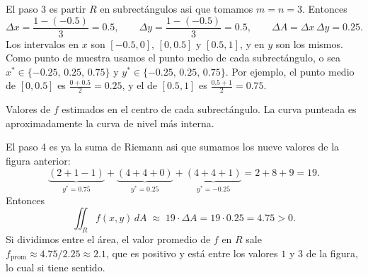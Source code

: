 \begin{respuesta}
    El paso 3 es partir $R$ en subrectángulos asi que tomamos $m=n=3$. Entonces
    \[
        \Delta x = \frac{1-(-0.5)}{3} = 0.5, \qquad
        \Delta y = \frac{1-(-0.5)}{3} = 0.5, \qquad
        \Delta A = \Delta x \,\Delta y = 0.25 .
    \]
    Los intervalos en $x$ son $[-0.5,0]$, $[0,0.5]$ y $[0.5,1]$, y en $y$ son los mismos.
    Como punto de muestra usamos el punto medio de cada subrectángulo, o sea
    $x^*\in\{-0.25,\,0.25,\,0.75\}$ y $y^*\in\{-0.25,\,0.25,\,0.75\}$.
    Por ejemplo, el punto medio de $[0,0.5]$ es $\frac{0+0.5}{2}=0.25$, y el de
    $[0.5,1]$ es $\frac{0.5+1}{2}=0.75$.

    \begin{center}

    \small Valores de $f$ estimados en el centro de cada subrectángulo.
    La curva punteada es aproximadamente la curva de nivel más interna.
    \end{center}

    El paso 4 es ya la suma de Riemann asi que sumamos los nueve valores de la figura anterior:
    \[
        \underbrace{(2+1-1)}_{y^*=0.75} + \underbrace{(4+4+0)}_{y^*=0.25}
        + \underbrace{(4+4+1)}_{y^*=-0.25} = 2 + 8 + 9 = 19 .
    \]
    Entonces
    \[
        \iint_R f(x,y)\, dA \;\approx\; 19 \cdot \Delta A = 19\cdot 0.25 = 4.75 > 0 .
    \]
    Si dividimos entre el área, el valor promedio de $f$ en $R$ sale
    $f_{\text{prom}} \approx 4.75/2.25 \approx 2.1$, que es positivo y está entre los
    valores $1$ y $3$ de la figura, lo cual si tiene sentido.


\end{respuesta}

